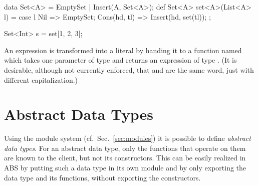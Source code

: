 \begin{absexample}
data Set<A> = EmptySet | Insert(A, Set<A>);
def Set<A> set<A>(List<A> l) = 
   case l {
      Nil => EmptySet;
      Cons(hd, tl) => Insert(hd, set(tl));
   } ;

{
  Set<Int> s = set[1, 2, 3];
}
\end{absexample}
An expression  is transformed into a literal by
handing it to a function named  which takes one parameter of
type  and returns an expression of type .  (It is
desirable, although not currently enforced, that  and
 are the same word, just with different capitalization.)

\section{Abstract Data Types}
\label{sec:abstract data types}
Using the module system (cf.~Sec.~\ref{sec:modules}) it is possible to define \emph{abstract data types}. For an abstract data type, only the functions that operate on them are known to the client, but not its constructors. This can be easily realized in ABS by putting such a data type in its own module and by only exporting the data type and its functions, without exporting the constructors.
